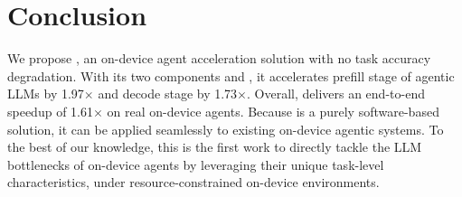 \section{Conclusion} \label{sect:conclusion}

We propose \proposed, an on-device agent acceleration solution with no task accuracy degradation. With its two components \prefill and \decode, it accelerates prefill stage of agentic LLMs by 1.97$\times$ and decode stage by 1.73$\times$. Overall, \proposed delivers an end-to-end speedup of 1.61$\times$ on real on-device agents. Because \proposed is a purely software-based solution, it can be applied seamlessly to existing on-device agentic systems. To the best of our knowledge, this is the first work to directly tackle the LLM bottlenecks of on-device agents by leveraging their unique task-level characteristics, under resource-constrained on-device environments.